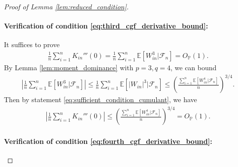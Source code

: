 \documentclass[12pt]{article}
\theoremstyle{definition}
\def\P{\mathbb{P}}
\def\P{\mathbb{P}}
\newcommand{\E}{\mathbb E}								%
\renewcommand{\P}{\mathbb{P}}							%
\begin{document}
\begin{proof}[Proof of Lemma \ref{lem:reduced_condition}]
	\paragraph{Verification of condition \eqref{eq:third_cgf_derivative_bound}:}

	It suffices to prove 
	\begin{align*}
		\frac{1}{n}\sum_{i=1}^n K_{in}'''(0)=\frac{1}{n}\sum_{i=1}^n \E[W_{in}^3|\mathcal{F}_n]=O_{\P}(1).
	\end{align*}
	By Lemma \ref{lem:moment_dominance} with $p=3,q=4$, we can bound 
	\begin{align*}
		\left|\frac{1}{n}\sum_{i=1}^n \E[W_{in}^3|\mathcal{F}_n]\right|\leq \frac{1}{n}\sum_{i=1}^n \E[|W_{in}|^3|\mathcal{F}_n]\leq \left(\frac{\sum_{i=1}^n \E[W_{in}^4|\mathcal{F}_n]}{n}\right)^{3/4}.
	\end{align*}
	Then by statement \eqref{eq:sufficient_condition_cumulant}, we have 
	\begin{align*}
		\left|\frac{1}{n}\sum_{i=1}^n K_{in}'''(0)\right|\leq \left(\frac{\sum_{i=1}^n \E[W_{in}^4|\mathcal{F}_n]}{n}\right)^{3/4}=O_{\P}(1).
	\end{align*}

	\paragraph{Verification of condition \eqref{eq:fourth_cgf_derivative_bound}:}


\end{proof}
\end{document}
